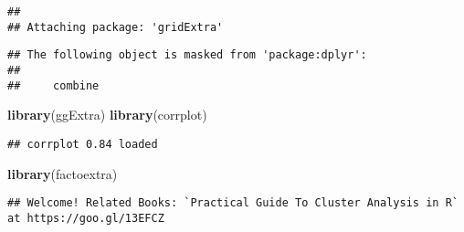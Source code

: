 \documentclass[]{article}
\newenvironment{Shaded}{\begin{snugshade}}{\end{snugshade}}
\newcommand{\KeywordTok}[1]{\textcolor[rgb]{0.13,0.29,0.53}{\textbf{#1}}}
\newcommand{\NormalTok}[1]{#1}
\begin{document}
\begin{verbatim}
## 
## Attaching package: 'gridExtra'
\end{verbatim}

\begin{verbatim}
## The following object is masked from 'package:dplyr':
## 
##     combine
\end{verbatim}

\begin{Shaded}
\begin{Highlighting}[]
\KeywordTok{library}\NormalTok{(ggExtra)}
\KeywordTok{library}\NormalTok{(corrplot)}
\end{Highlighting}
\end{Shaded}

\begin{verbatim}
## corrplot 0.84 loaded
\end{verbatim}

\begin{Shaded}
\begin{Highlighting}[]
\KeywordTok{library}\NormalTok{(factoextra)}
\end{Highlighting}
\end{Shaded}

\begin{verbatim}
## Welcome! Related Books: `Practical Guide To Cluster Analysis in R` at https://goo.gl/13EFCZ
\end{verbatim}
\end{document}
